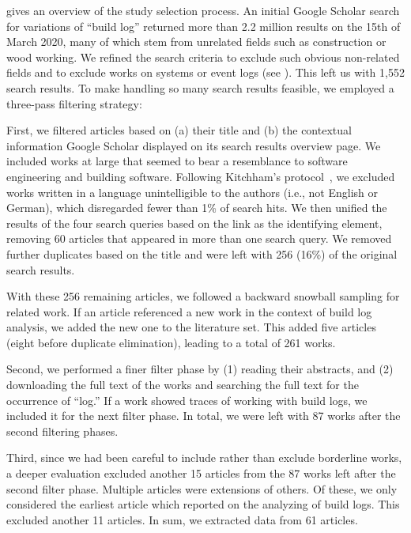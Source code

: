  gives an overview of the study selection
process.
An initial Google Scholar search for variations of ``build log''
returned more than 2.2 million results on the 15th of March 2020, many
of which stem
from unrelated fields such as construction or wood working.
We refined the search criteria to exclude such obvious
non-related fields and to exclude works on systems
or event logs (see ).
This left us with 1,552 search results.
To make handling so many search results feasible, we employed a
three-pass filtering strategy:

First, we filtered articles based on (a) their title and (b) the
contextual information Google Scholar displayed on its search results
overview page.
We included works at large that seemed to bear a resemblance to software
engineering and building software.
Following Kitchham's protocol~\cite{kitchenham2009systematic}, we excluded
works written in a language unintelligible to the authors
(i.e., not English or German), which disregarded fewer than 1\% of search
hits.
We then unified
the results of the four search queries based on the link as the
identifying element, removing 60 articles that appeared in more than
one search query.
We removed further duplicates based on the title and were
left with 256 (16\%) of the original search results.

With these 256 remaining articles, we followed a backward snowball
sampling for related work.
If an article referenced a new work in the context
of build log analysis, we added the new one to the literature set.
This added five articles (eight before
duplicate elimination), leading to a total of 261
works.

Second, we performed a finer filter phase by (1) reading their abstracts,
and (2) downloading the
full text of the works and searching the
full text
for the occurrence of ``log.''
If a work showed traces of
working with build logs, we included it for the next filter phase.
In total, we
were left with 87 works after the second filtering phases.

Third, since we had been careful to include rather than exclude borderline
works, a deeper evaluation excluded another 15 articles from the 87
works left after the second filter phase.
Multiple articles were extensions of others.
Of these, we only considered the earliest article which reported on
the analyzing of build logs.
This excluded another 11 articles.
In sum, we extracted data from 61 articles.

